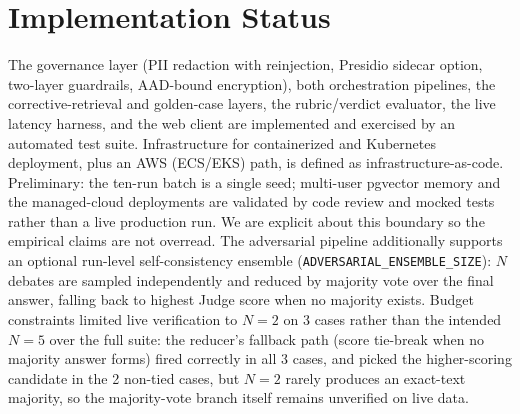 \documentclass{article}
\begin{document}
\section{Implementation Status}
The governance layer (PII redaction with reinjection, Presidio sidecar option, two-layer
guardrails, AAD-bound encryption), both orchestration pipelines, the corrective-retrieval and
golden-case layers, the rubric/verdict evaluator, the live latency harness, and the web client
are implemented and exercised by an automated test suite. Infrastructure for containerized and
Kubernetes deployment, plus an AWS (ECS/EKS) path, is defined as infrastructure-as-code.
Preliminary: the ten-run batch is a single seed; multi-user pgvector memory and the
managed-cloud deployments are validated by code review and mocked tests rather than a live
production run. We are explicit about this boundary so the empirical claims are not overread.
The adversarial pipeline additionally supports an optional run-level self-consistency
ensemble (\texttt{ADVERSARIAL\_ENSEMBLE\_SIZE}): $N$ debates are sampled independently and
reduced by majority vote over the final answer, falling back to highest Judge score when no
majority exists. Budget constraints limited live verification to $N=2$ on 3 cases rather than
the intended $N=5$ over the full suite: the reducer's fallback path (score tie-break when no
majority answer forms) fired correctly in all 3 cases, and picked the higher-scoring candidate
in the 2 non-tied cases, but $N=2$ rarely produces an exact-text majority, so the majority-vote
branch itself remains unverified on live data.
\end{document}
